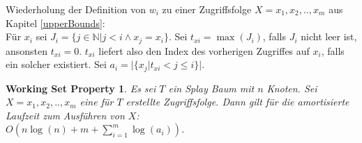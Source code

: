 \documentclass[a4paper,12pt]{article}
\begin{document}
\noindent Wiederholung der Definition von $w_i$ zu einer Zugriffsfolge $X = x_1, x_2,.., x_m$ aus Kapitel \ref{upperBounds}:\\
Für $x_i$ sei $J_i = \{j \in \mathbb{N} \vert j < i \land x_j = x_i \}$.
Sei $t_{xi} = \max \left(J_i\right)$, falls $J_i$ nicht leer ist, ansonsten $t_{xi} = 0$. $t_{xi}$ liefert also den Index des vorherigen Zugriffes auf $x_i$, falls ein solcher existiert. Sei ${a_i = \vert\{x_j \vert t_{xi} < j \leq i   \} \vert }$.

\newtheorem{Satz2}{Working Set Property}[section] \label{workingSetSplay}
\begin{Satz2} Es sei $T$ ein Splay Baum mit $n$ Knoten. Sei $X = x_1,x_2,..,x_m$ eine für $T$ erstellte Zugriffsfolge. Dann gilt für die amortisierte Laufzeit zum Ausführen von $X$: \\
	$O\left( n \log\left(n\right) + m +\sum_{i = 1}^{m} \log\left( a_i\right) \right)$.
\end{Satz2}
\end{document}
